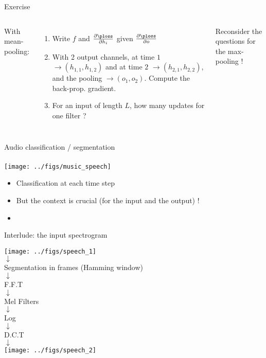 \begin{frame}{Exercise}
\begin{columns}
$$      $$
     With mean-pooling:
    \begin{enumerate}
    \item Write $f$ and $\frac{\partial \ploss }{\partial h_i}$ given $\frac{\partial \ploss }{\partial o}$ 
    \item With 2 output channels, at time $1$ $\rightarrow (h_{1,1},h_{1,2})$ and at time $2$ $\rightarrow (h_{2,1},h_{2,2})$, and the pooling $\rightarrow (o_1, o_2)$. Compute the back-prop. gradient. 
    \item For an input of length $L$, how many updates for one filter ? 
    \end{enumerate}
    Reconsider the questions for the max-pooling !
  \end{columns}
\end{frame}

\begin{frame}{Audio classification / segmentation}
  \framesubtitle{\cite{Jang19Music}}
  \begin{center}
    \texttt{[image: ../figs/music\_speech]}    
  \end{center}
  \begin{itemize}
  \item Classification at each time step
  \item But the context is crucial (for the input and the output) ! 
  \item {}
  \end{itemize}
\end{frame}


\begin{frame}{Interlude: the input spectrogram}
  \begin{center}
    \texttt{[image: ../figs/speech\_1]}\\
    $\downarrow$ \\
    Segmentation in frames (Hamming window)\\
    $\downarrow$ \\
    F.F.T \\
    $\downarrow$ \\
    Mel Filters \\
    $\downarrow$ \\
    Log\\
    $\downarrow$ \\
    D.C.T  \\
    $\downarrow$ \\
    \texttt{[image: ../figs/speech\_2]}\\
  \end{center}
\end{frame}



